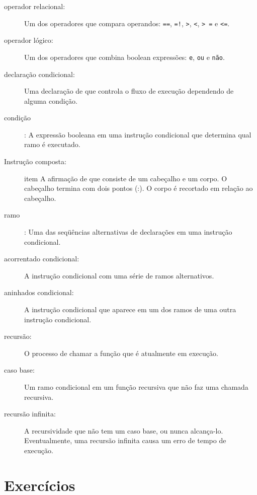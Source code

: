 \documentclass[10pt]{book}
\begin{document}
{{\begin{description}
\item[operador relacional:] Um dos operadores que compara
operandos: {\tt ==}, {\tt =!}, {\tt>}, {\tt <}, {\tt> =} e {\tt <=}.

\item[operador lógico:] Um dos operadores que combina boolean
expressões: {\tt e}, {\tt ou} e {\tt não}.

\item[declaração condicional:] Uma declaração de que controla o fluxo de
execução dependendo de alguma condição.

\item[condição]: A expressão booleana em uma instrução condicional
que determina qual ramo é executado.

\item[Instrução composta:] item A afirmação de que consiste de um cabeçalho
e um corpo. O cabeçalho termina com dois pontos (:). O corpo é recortado
em relação ao cabeçalho.

\item[ramo]: Uma das seqüências alternativas de declarações em
uma instrução condicional.

\item[acorrentado condicional:] A instrução condicional com uma série
de ramos alternativos.

\item[aninhados condicional:] A instrução condicional que aparece
em um dos ramos de uma outra instrução condicional.

\item[recursão:] O processo de chamar a função que é
atualmente em execução.

\item[caso base:] Um ramo condicional em um
função recursiva que não faz uma chamada recursiva.

\item[recursão infinita:] A recursividade que não tem um
caso base, ou nunca alcança-lo. Eventualmente, uma recursão infinita
causa um erro de tempo de execução.

\end{description}

\section{Exercícios}

}}
\end{document}
